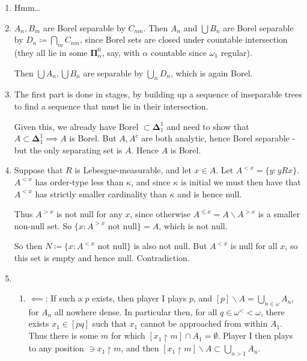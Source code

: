 \documentclass[]{article}
\newcommand{\om}{\omega}
\newcommand{\lom}{{<\omega}}
\newcommand{\bopi}{\bm{\Pi}}
\newcommand{\bodel}{\bm{\Delta}}
\begin{document}
\begin{enumerate}[label = (\arabic*)]
    \item Hmm\dots
    
    \item $A_n,B_m$ are Borel separable by $C_{nm}$. Then $A_n$ and $\bigcup B_n$ are Borel separable by $D_n \coloneqq \bigcap_{m}C_{nm}$, since Borel sets are closed under countable intersection (they all lie in some $\bopi^0_\alpha$, say, with $\alpha$ countable since $\om_1$ regular).
    
    Then $\bigcup A_n,\bigcup B_n$ are separable by $\bigcup_{n} D_n$, which is again Borel.

    \item The first part is done in stages, by building up a sequence of inseparable trees to find a sequence that must lie in their intersection.
    
    Given this, we already have Borel $\subset \bodel^1_1$ and need to show that $A\subset \bodel^1_1 \implies A$ is Borel. But $A,A^c$ are both analytic, hence Borel separable - but the only separating set is $A$. Hence $A$ is Borel.
    
    \item Suppose that $R$ is Lebesgue-measurable, and let $x \in A$. Let $A^{<x} = \{y : yRx\}$. $A^{<x}$ has order-type less than $\kappa$, and since $\kappa$ is initial we must then have that $A^{<x}$ has strictly smaller cardinality than $\kappa$ and is hence null.
    
    Thus $A^{>x}$ is not null for any $x$, since otherwise $A^{\le x} = A\backslash A^{>x}$ is a smaller non-null set. So $\{x : A^{>x}\textrm{ not null}\} = A$, which is not null.

    So then $N\coloneqq \{x : A^{<x}\textrm{ not null}\}$ is also not null. But $A^{<x}$ is null for all $x$, so this set is empty and hence null. Contradiction.

    \item \begin{enumerate}[label = (\roman*)]
        \item \underline{$\impliedby$}: If such a $p$ exists, then player I plays $p$, and $[p]\backslash A = \bigcup_{n\in \om}A_n$, for $A_n$ all nowhere dense. In particular then, for all $q \in \om^<\lom$, there exists $x_1 \in [pq]$ such that $x_1$ cannot be approached from within $A_1$. Thus there is some $m$ for which $[x_1\restriction m] \cap A_1 = \emptyset$. Player I then plays to any position $\owns x_1\restriction m$, and then $[x_1\restriction m] \backslash A \subset \bigcup_{n>1}A_n$.
        

\end{enumerate}
\end{enumerate}
\end{document}
